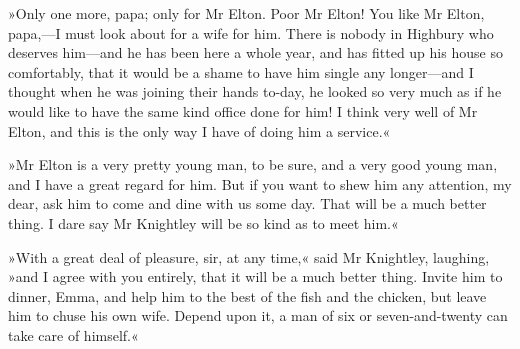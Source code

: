 »Only one more, papa; only for Mr Elton. Poor Mr Elton! You like Mr Elton, papa,—I must look about for a wife for him. There is nobody in Highbury who deserves him—and he has been here a whole year, and has fitted up his house so comfortably, that it would be a shame to have him single any longer—and I thought when he was joining their hands to-day, he looked so very much as if he would like to have the same kind office done for him! I think very well of Mr Elton, and this is the only way I have of doing him a service.«

»Mr Elton is a very pretty young man, to be sure, and a very good young man, and I have a great regard for him. But if you want to shew him any attention, my dear, ask him to come and dine with us some day. That will be a much better thing. I dare say Mr Knightley will be so kind as to meet him.«

»With a great deal of pleasure, sir, at any time,« said Mr Knightley, laughing, »and I agree with you entirely, that it will be a much better thing. Invite him to dinner, Emma, and help him to the best of the fish and the chicken, but leave him to chuse his own wife. Depend upon it, a man of six or seven-and-twenty can take care of himself.«